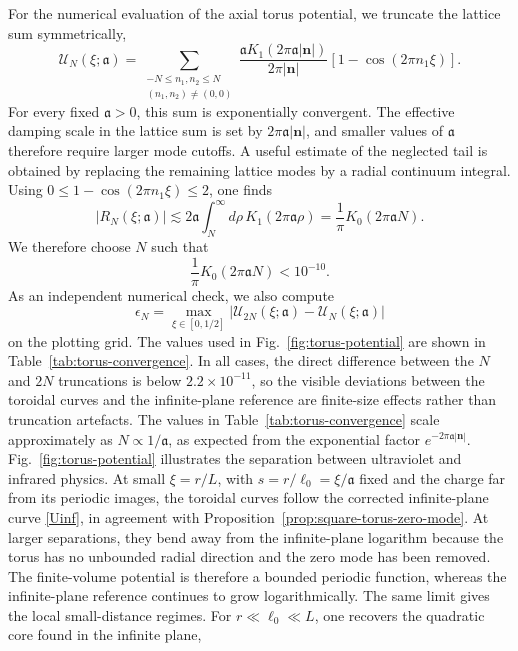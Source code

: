\documentclass[openacc]{rsproca_new}%
\begin{document}
For the numerical evaluation of the axial torus potential, we truncate the lattice sum symmetrically,
\begin{equation}
\mathcal U_N(\xi;\mathfrak a)=\sum_{\substack{-N\leq n_1,n_2\leq N\\(n_1,n_2)\neq(0,0)}}
\frac{\mathfrak a K_1(2\pi\mathfrak a|\mathbf n|)}{2\pi|\mathbf n|}
\left[1-\cos(2\pi n_1\xi)\right].
\end{equation}
For every fixed \(\mathfrak a>0\), this sum is exponentially convergent. The effective damping scale in the lattice sum is set by \(2\pi\mathfrak a|\mathbf n|\), and smaller values of \(\mathfrak a\) therefore require larger mode cutoffs. A useful estimate of the neglected tail is obtained by replacing the remaining lattice modes by a radial continuum integral. Using \(0\leq1-\cos(2\pi n_1\xi)\leq2\), one finds
\begin{equation}
  |R_N(\xi;\mathfrak a)|\lesssim2\mathfrak a\int_N^\infty d\rho\,K_1(2\pi\mathfrak a\rho)
  =\frac{1}{\pi}K_0(2\pi\mathfrak a N).
\end{equation}
We therefore choose \(N\) such that
\begin{equation}\label{cutoff}
  \frac{1}{\pi}K_0(2\pi\mathfrak a N)<10^{-10}.
\end{equation}
As an independent numerical check, we also compute
\begin{equation}\label{error}
\epsilon_N=\max_{\xi\in[0,1/2]}\left|\mathcal U_{2N}(\xi;\mathfrak a)-\mathcal U_N(\xi;\mathfrak a)\right|
\end{equation}
on the plotting grid. The values used in Fig.~\ref{fig:torus-potential} are shown in Table~\ref{tab:torus-convergence}. In all cases, the direct difference between the \(N\) and \(2N\) truncations is below \(2.2\times10^{-11}\), so the visible deviations between the toroidal curves and the infinite-plane reference are finite-size effects rather than truncation artefacts. The values in Table~\ref{tab:torus-convergence} scale approximately as \(N\propto1/\mathfrak a\), as expected from the exponential factor \(e^{-2\pi\mathfrak a|\mathbf n|}\). Fig.~\ref{fig:torus-potential} illustrates the separation between ultraviolet and infrared physics. At small \(\xi=r/L\), with \(s=r/\ell_0=\xi/\mathfrak a\) fixed and the charge far from its periodic images, the toroidal curves follow the corrected infinite-plane curve \eqref{Uinf}, in agreement with Proposition~\ref{prop:square-torus-zero-mode}. At larger separations, they bend away from the infinite-plane logarithm because the torus has no unbounded radial direction and the zero mode has been removed. The finite-volume potential is therefore a bounded periodic function, whereas the infinite-plane reference continues to grow logarithmically. The same limit gives the local small-distance regimes. For \(r\ll\ell_0\ll L\), one recovers the quadratic core found in the infinite plane,
\end{document}

